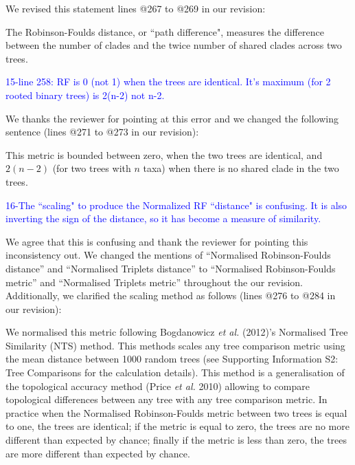 \documentclass[11pt]{letter}
\begin{document}
\begin{letter}{}
We revised this statement lines @267 to @269 in our revision:

\hfill\begin{minipage}{\dimexpr\textwidth-1cm}
The Robinson-Foulds distance, or ``path difference", measures the difference between the number of clades and the twice number of shared clades across two trees.
\end{minipage}


\textcolor{blue}{15-line 258: RF is 0 (not 1) when the trees are identical. It's maximum (for 2 rooted binary trees) is 2(n-2) not n-2.}

We thanks the reviewer for pointing at this error and we changed the following sentence (lines @271 to @273 in our revision):

\hfill\begin{minipage}{\dimexpr\textwidth-1cm}
This metric is bounded between zero, when the two trees are identical, and $2(n-2)$ (for two trees with $n$ taxa) when there is no shared clade in the two trees.
\end{minipage}


\textcolor{blue}{16-The ``scaling" to produce the Normalized RF ``distance" is confusing. It is also inverting the sign of the distance, so it has become a measure of similarity.}

We agree that this is confusing and thank the reviewer for pointing this inconsistency out. We changed the mentions of ``Normalised Robinson-Foulds distance'' and ``Normalised Triplets distance'' to ``Normalised Robinson-Foulds metric'' and ``Normalised Triplets metric'' throughout the our revision. Additionally, we clarified the scaling method as follows (lines @276 to @284 in our revision):

\hfill\begin{minipage}{\dimexpr\textwidth-1cm}
We normalised this metric following Bogdanowicz \textit{et al.} (2012)'s Normalised Tree Similarity (NTS) method. This methods scales %
any tree comparison metric using the mean distance between 1000 random trees (see Supporting Information S2: Tree Comparisons for the calculation details). This method is a generalisation of the topological accuracy method (Price \textit{et al.} 2010) allowing to compare topological differences between any tree with any tree comparison metric. In practice when the Normalised Robinson-Foulds metric between two trees is equal to one, the trees are identical; if the metric is equal to zero, the trees are no more different than expected by chance; finally if the metric is less than zero, the trees are more different than expected by chance.
\end{minipage}


\end{letter}
\end{document}
